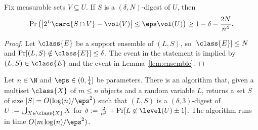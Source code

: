 %
\begin{corollary}
    \label{cor:digest}
    Fix measurable sets $V \subseteq U$. If $S$ is a $(\delta,N)$-digest of $U$, then
    \[ \Pr\left( \left| 2^L \card{S \cap V} - \vol(V) \right| \leq \eps \vol(U) \right)
    \geq 1 - \delta - \frac{2N}{n^4}. \]
\end{corollary}
%
\begin{proof}
    Let $\class{E}$ be a support ensemble of $(L,S)$, so $|\class{E}| \leq N$ and $\Pr[(L,S) \notin \class{E}] \leq \delta$. The event in the statement is implied by $(L,S) \in \class{E}$ and the event in Lemma~\ref{lem:ensemble}.
\end{proof}
%
\begin{lemma}
    \label{lem:erase-resample}
    Let $n \in \N$ and $\eps \in (0,\frac{1}{4}]$ be parameters. There is an algorithm  that, given a multiset $\class{X}$ of $m \leq n$ objects and a random variable $L$, returns a set $S$ of size $|S| = O(\log(n)/\eps^2)$ such that $(L,S)$ is a $(\delta, 3)$-digest of $U := \bigcup_{X \in \class{X}} X$ for $\delta := \frac{2}{n^3} + \Pr[L \not\in \level(U) \pm 1]$. The algorithm runs in time $O(m \log(n) / \eps^2)$.
\end{lemma}
%
\begin{algorithm}[htb]
    \caption{Digesting a decremental union}
    \label{alg:erase-resample}
\end{algorithm}
%
